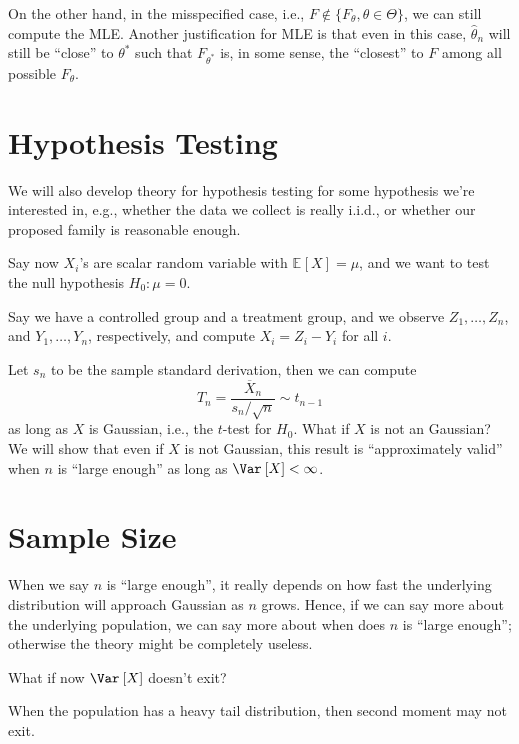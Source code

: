 On the other hand, in the misspecified case, i.e., \(F \notin \{ F_{\theta } , \theta \in \Theta \} \), we can still compute the MLE. Another justification for MLE is that even in this case, \(\hat{\theta} _n\) will still be ``close'' to \(\theta ^{\ast} \) such that \(F_{\theta ^{\ast} }\) is, in some sense, the ``closest'' to \(F\) among all possible \(F_\theta \).

\section{Hypothesis Testing}
We will also develop theory for hypothesis testing for some hypothesis we're interested in, e.g., whether the data we collect is really i.i.d., or whether our proposed family is reasonable enough.

Say now \(X_i\)'s are scalar random variable with \(\mathbb{E}_{}\left[X \right] = \mu \), and we want to test the null hypothesis \(H_0 \colon \mu = 0\).

\begin{eg}
	Say we have a controlled group and a treatment group, and we observe \(Z_1, \dots , Z_n\), and \(Y_1, \dots , Y_n\), respectively, and compute \(X_i = Z_i - Y_i\) for all \(i\).
\end{eg}

Let \(s_n\) to be the sample standard derivation, then we can compute
\[
	T_n = \frac{\overline{X} _n}{s_n / \sqrt{n} } \sim t_{n-1}
\]
as long as \(X\) is Gaussian, i.e., the \(t\)-test for \(H_0\). What if \(X\) is not an Gaussian? We will show that even if \(X\) is not Gaussian, this result is ``approximately valid'' when \(n\) is ``large enough'' as long as \(\Var_{}\left[X \right] < \infty \).

\section{Sample Size}
When we say \(n\) is ``large enough'', it really depends on how fast the underlying distribution will approach Gaussian as \(n\) grows. Hence, if we can say more about the underlying population, we can say more about when does \(n\) is ``large enough''; otherwise the theory might be completely useless.

What if now \(\Var_{}\left[X \right] \) doesn't exit?

\begin{eg}
	When the population has a heavy tail distribution, then second moment may not exit.
\end{eg}

